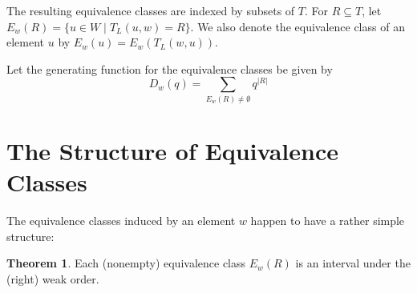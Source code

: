 \documentclass[10pt]{amsart}
\theoremstyle{definition}
\theoremstyle{definition}
\newtheorem{theorem}{Theorem}
\begin{document}
The resulting equivalence classes are indexed by subsets of $T$. For $R \subseteq T$, let $E_w(R) = \{u \in W \mid T_L(u, w) = R\}$. We also denote the equivalence class of an element $u$ by $E_w(u) = E_w(T_L(w, u))$.

Let the generating function for the equivalence classes be given by
\[
D_w(q) = \sum_{E_w(R) \neq \emptyset} q^{|R|}
\]

\section{The Structure of Equivalence Classes}
The equivalence classes induced by an element $w$ happen to have a rather simple structure:

\begin{theorem}
Each (nonempty) equivalence class $E_w(R)$ is an interval under the (right) weak order.
\end{theorem}
\end{document}
